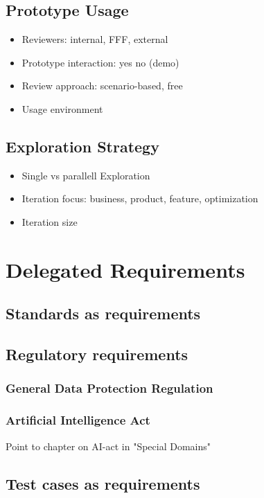 \documentclass{reqengbook}
\begin{document}
\section{Prototype Usage}
\begin{itemize}
  \item Reviewers: internal, FFF, external
  \item Prototype interaction: yes no (demo)
  \item Review approach: scenario-based, free
  \item Usage environment
\end{itemize}

\section{Exploration Strategy}
\begin{itemize}
  \item Single vs parallell Exploration
  \item Iteration focus: business, product, feature, optimization
  \item Iteration size
\end{itemize}


\chapter{Delegated Requirements}

\section{Standards as requirements}

\section{Regulatory requirements}

\subsection{General Data Protection Regulation} 

\subsection{Artificial Intelligence Act}
Point to chapter on AI-act in "Special Domains"

\section{Test cases as requirements}
\end{document}
